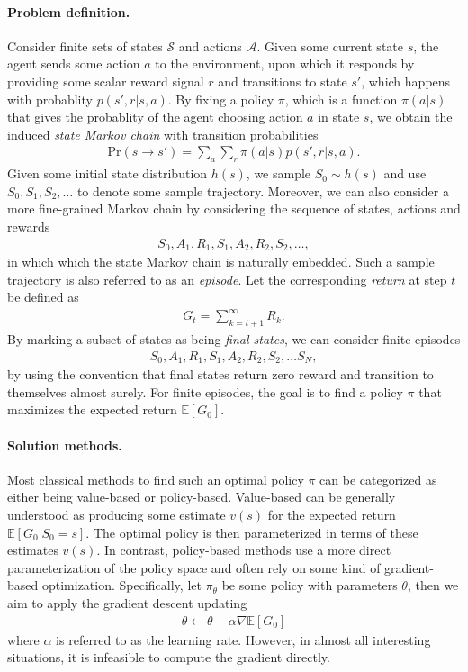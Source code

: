\documentclass[a4paper]{report}
\theoremstyle{definition}
\theoremstyle{plain}
\begin{document}
\paragraph{Problem definition.}
Consider finite sets of states $\mathcal{S}$ and actions $\mathcal{A}$.
%
Given some current state $s$, the agent sends some action $a$ to the
environment, upon which it responds by providing some scalar reward signal $r$
and transitions to state $s'$, which happens with probablity $p(s', r | s, a)$.
%
By fixing a policy $\pi$, which is a function $\pi(a|s)$ that gives the
probablity of the agent choosing action $a$ in state $s$, we obtain the induced
\emph{state Markov chain} with transition probabilities
%
\begin{align*}
  \mathrm{Pr}(s \rightarrow s') = \sum_{a} \sum_{r} \pi(a|s) p(s', r | s, a) .
\end{align*}
Given some initial state distribution $h(s)$, we sample $S_{0} \sim h(s)$ and
use $S_{0}, S_{1}, S_{2}, \dots$ to denote some sample trajectory.
%
Moreover, we can also consider a more fine-grained Markov chain by considering
the sequence of states, actions and rewards
\begin{align*}
  S_{0}, A_{1}, R_{1}, S_{1}, A_{2}, R_{2}, S_{2}, \dots ,
\end{align*}
in which which the state Markov chain is naturally embedded. Such a sample
trajectory is also referred to as an \emph{episode}.
%
Let the corresponding \emph{return} at step $t$ be
defined as
\begin{align*}
  G_{t} = \sum_{k=t+1}^{\infty} R_{k} .
\end{align*}
By marking a subset of states as being \emph{final states}, we can consider finite episodes
\begin{align*}
  S_{0}, A_{1}, R_{1}, S_{1}, A_{2}, R_{2}, S_{2}, \dots S_{N},
\end{align*}
by using the convention that final states return zero reward and transition to
themselves almost surely.
%
For finite episodes, the goal is to find a policy $\pi$ that maximizes the
expected return $\mathbb{E}[G_{0}]$.

\paragraph{Solution methods.}
Most classical methods to find such an optimal policy $\pi$ can be categorized
as either being value-based or policy-based.
%
Value-based can be generally understood as producing some estimate $v(s)$ for
the expected return $\mathbb{E}[G_{0} | S_{0} = s]$. The optimal policy is then
parameterized in terms of these estimates $v(s)$.
%
In contrast, policy-based methods use a more direct parameterization of the
policy space and often rely on some kind of gradient-based optimization.
Specifically, let $\pi_{\theta}$ be some policy with parameters $\theta$, then we aim to
apply the gradient descent updating
\begin{align*}
  \theta \leftarrow \theta - \alpha \nabla \mathbb{E} [ G_{0} ]
\end{align*}
where $\alpha$ is referred to as the learning rate.
%
However, in almost all interesting situations, it is infeasible to compute the
gradient directly.
\end{document}
